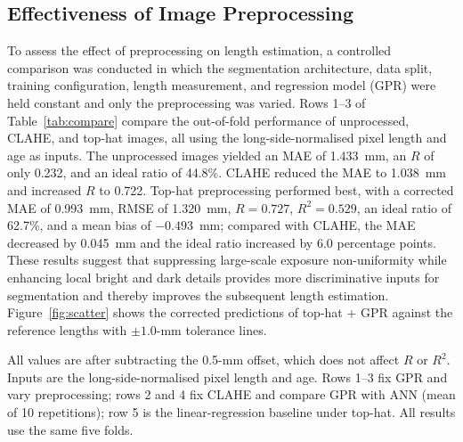 \subsection{Effectiveness of Image Preprocessing}
To assess the effect of preprocessing on length estimation, a controlled comparison was conducted in which the segmentation architecture, data split, training configuration, length measurement, and regression model (GPR) were held constant and only the preprocessing was varied. Rows 1--3 of Table~\ref{tab:compare} compare the out-of-fold performance of unprocessed, CLAHE, and top-hat images, all using the long-side-normalised pixel length and age as inputs. The unprocessed images yielded an MAE of 1.433~mm, an $R$ of only 0.232, and an ideal ratio of 44.8\%. CLAHE reduced the MAE to 1.038~mm and increased $R$ to 0.722. Top-hat preprocessing performed best, with a corrected MAE of 0.993~mm, RMSE of 1.320~mm, $R=0.727$, $R^2=0.529$, an ideal ratio of 62.7\%, and a mean bias of $-0.493$~mm; compared with CLAHE, the MAE decreased by 0.045~mm and the ideal ratio increased by 6.0 percentage points. These results suggest that suppressing large-scale exposure non-uniformity while enhancing local bright and dark details provides more discriminative inputs for segmentation and thereby improves the subsequent length estimation. Figure~\ref{fig:scatter} shows the corrected predictions of top-hat + GPR against the reference lengths with $\pm1.0$-mm tolerance lines.

\begin{table}[t]
\centering
\caption{Root canal filling-length estimation with different preprocessing and regression models (out-of-fold, $n=67$).}
\label{tab:compare}

\smallskip
\begin{minipage}{0.95\linewidth}\footnotesize
All values are after subtracting the 0.5-mm offset, which does not affect $R$ or $R^2$. Inputs are the long-side-normalised pixel length and age. Rows 1--3 fix GPR and vary preprocessing; rows 2 and 4 fix CLAHE and compare GPR with ANN (mean of 10 repetitions); row 5 is the linear-regression baseline under top-hat. All results use the same five folds.
\end{minipage}
\end{table}

